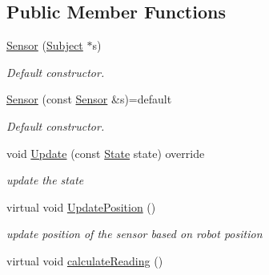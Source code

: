 \subsection*{Public Member Functions}
\begin{DoxyCompactItemize}
\item 
\hyperlink{classSensor_a4235b73bd5ffac18c11b6f05b94806c0}{Sensor} (\hyperlink{classSubject}{Subject} $\ast$s)\hypertarget{classSensor_a4235b73bd5ffac18c11b6f05b94806c0}{}\label{classSensor_a4235b73bd5ffac18c11b6f05b94806c0}

\begin{DoxyCompactList}\small\item\em Default constructor. \end{DoxyCompactList}\item 
\hyperlink{classSensor_a93b74e0e1589a0c6883f8ea4ef18da27}{Sensor} (const \hyperlink{classSensor}{Sensor} \&s)=default\hypertarget{classSensor_a93b74e0e1589a0c6883f8ea4ef18da27}{}\label{classSensor_a93b74e0e1589a0c6883f8ea4ef18da27}

\begin{DoxyCompactList}\small\item\em Default constructor. \end{DoxyCompactList}\item 
void \hyperlink{classSensor_ae497b2541ad92dbef53c780b71901aaf}{Update} (const \hyperlink{structState}{State} state) override
\begin{DoxyCompactList}\small\item\em update the state \end{DoxyCompactList}\item 
virtual void \hyperlink{classSensor_a388457da641273f2ebec746ee131ef90}{Update\+Position} ()\hypertarget{classSensor_a388457da641273f2ebec746ee131ef90}{}\label{classSensor_a388457da641273f2ebec746ee131ef90}

\begin{DoxyCompactList}\small\item\em update position of the sensor based on robot position \end{DoxyCompactList}\item 
virtual void \hyperlink{classSensor_a986b7785ff5062e212d58018887b942f}{calculate\+Reading} ()\hypertarget{classSensor_a986b7785ff5062e212d58018887b942f}{}\label{classSensor_a986b7785ff5062e212d58018887b942f}


\end{DoxyCompactItemize}
